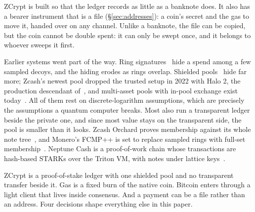 \documentclass[twocolumn,10pt]{article}
\begin{document}
ZCrypt is built so that the ledger records as little as a banknote does. It also has a bearer instrument that is a file (\S\ref{sec:addresses}): a coin's secret and the gas to move it, handed over on any channel. Unlike a banknote, the file can be copied, but the coin cannot be double spent: it can only be swept once, and it belongs to whoever sweeps it first.

Earlier systems went part of the way. Ring signatures~\cite{monero2013} hide a spend among a few sampled decoys, and the hiding erodes as rings overlap. Shielded pools~\cite{hopwood2016zcash} hide far more; Zcash's newest pool dropped the trusted setup in 2022 with Halo 2, the production descendant of~\cite{halo}, and multi-asset pools with in-pool exchange exist today~\cite{penumbra,namada}. All of them rest on discrete-logarithm assumptions, which are precisely the assumptions a quantum computer breaks. Most also run a transparent ledger beside the private one, and since most value stays on the transparent side, the pool is smaller than it looks. Zcash Orchard proves membership against its whole note tree~\cite{orchard}, and Monero's FCMP++ is set to replace sampled rings with full-set membership~\cite{fcmp}. Neptune Cash is a proof-of-work chain whose transactions are hash-based STARKs over the Triton VM, with notes under lattice keys~\cite{neptune}.

ZCrypt is a proof-of-stake ledger with one shielded pool and no transparent transfer beside it. Gas is a fixed burn of the native coin. Bitcoin enters through a light client that lives inside consensus. And a payment can be a file rather than an address. Four decisions shape everything else in this paper.
\end{document}
